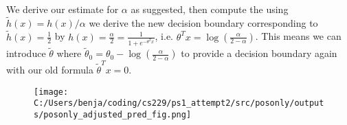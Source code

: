 %
%
\begin{answer}
We derive our estimate for $\alpha$ as suggested, then compute the using $\tilde{h}(x) = h(x)/\alpha$ we derive the new decision boundary corresponding to $\tilde{h}(x) = \frac{1}{2}$ by $h(x)=\frac{\alpha}{2} = \frac{1}{1 + e^{-\theta^T x}}$, i.e. $\theta^T x = \log(\frac{\alpha}{2 - \alpha})$. This means we can introduce $\tilde{\theta}$ where $\tilde{\theta}_0 = \theta_0 - \log(\frac{\alpha}{2 - \alpha})$ to provide a decision boundary again with our old formula $\tilde{\theta}^T x = 0$.

\begin{figure}[H]
\texttt{[image: C:/Users/benja/coding/cs229/ps1\_attempt2/src/posonly/outputs/posonly\_adjusted\_pred\_fig.png]}
\end{figure}
\end{answer}
%